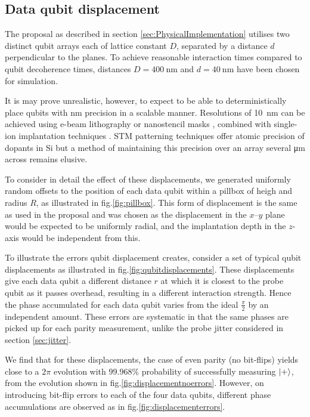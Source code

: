 
\subsection{Data qubit displacement}
The proposal \cite{OGorman2016} as described in section \ref{sec:PhysicalImplementation} utilises two distinct qubit arrays each of lattice constant $D$, separated by a distance $d$ perpendicular to the planes. To achieve reasonable interaction times compared to qubit decoherence times, distances $D = \SI{400}{\nano\metre}$ and $d = \SI{40}{\nano\metre}$ have been chosen for simulation.

It is may prove unrealistic, however, to expect to be able to deterministically place qubits with \si{\nano\metre} precision in a scalable manner. Resolutions of \SI{10}{\nano\metre} can be achieved using e-beam lithography \cite{Vieu2000a} or nanostencil masks \cite{Weis2008}, combined with single-ion implantation techniques \cite{Jamieson2005}. STM patterning techniques offer atomic precision of dopants in Si \cite{Schofield2003} but a method of maintaining this precision over an array several \si{\micro\metre} across remains elusive. 

To consider in detail the effect of these displacements, we generated uniformly random offsets to the position of each data qubit within a pillbox of heigh and radius $R$, as illustrated in fig.\@ \ref{fig:pillbox}. This form of displacement is the same as used in the proposal \cite{OGorman2016} and was chosen as the displacement in the $x$--$y$ plane would be expected to be uniformly radial, and the implantation depth in the $z$-axis would be independent from this.

To illustrate the errors qubit displacement creates, consider a set of typical qubit displacements as illustrated in fig.\@ \ref{fig:qubitdisplacements}. These displacements give each data qubit a different distance $r$ at which it is closest to the probe qubit as it passes overhead, resulting in a different interaction strength. Hence the phase accumulated for each data qubit varies from the ideal $\tfrac{\pi}{2}$ by an independent amount. These errors are systematic in that the same phases are picked up for each parity measurement, unlike the probe jitter considered in section \ref{sec:jitter}.

We find that for these displacements, the case of even parity (no bit-flips) yields close to a $2\pi$ evolution with $99.968\%$ probability of successfully measuring $\ket{+}$, from the evolution shown in fig.\@ \ref{fig:displacementnoerrors}. However, on introducing bit-flip errors to each of the four data qubits, different phase accumulations are observed as in fig.\@ \ref{fig:displacementerrors}.



